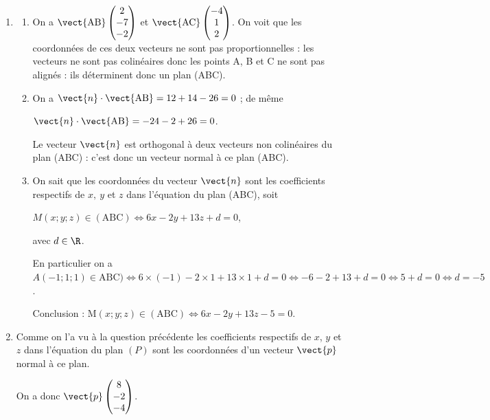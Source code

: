 \begin{enumerate}
	\item \begin{enumerate}
		\item On a $\vect{\text{AB}}\begin{pmatrix}2\\-7\\-2\end{pmatrix}$ et $\vect{\text{AC}}\begin{pmatrix}-4\\1\\2\end{pmatrix}$. On voit que les coordonnées de ces deux vecteurs ne sont pas proportionnelles : les vecteurs ne sont pas colinéaires donc les points A, B et C ne sont pas alignés : ils déterminent donc un plan (ABC).

		\item On a $\vect{n} \cdot \vect{\text{AB}} = 12 + 14 - 26 = 0$ ; de même

		$\vect{n} \cdot \vect{\text{AB}} = - 24 - 2 + 26 = 0$.

		Le vecteur $\vect{n}$ est orthogonal à deux vecteurs non colinéaires du plan (ABC) : c'est donc un vecteur normal à ce plan (ABC).

		\item On sait que les coordonnées du vecteur $\vect{n}$ sont les coefficients respectifs de $x, \: y$ et $z$ dans l'équation du plan (ABC), soit

		$M(x ; y ; z) \in (\text{ABC}) \iff 6x - 2y + 13z + d = 0$,

		avec $d \in \R$.

		En particulier on a $A(-1 ; 1 ; 1) \in \text{ABC}) \iff 6\times (-1) - 2\times 1 + 13\times 1 + d = 0 \iff - 6 - 2 + 13 + d = 0 \iff 5 + d = 0 \iff d = - 5$.

		Conclusion : \quad $\mathrm{M}(x ; y ; z) \in (\text{ABC}) \iff 6x - 2y + 13z - 5 = 0$.
	\end{enumerate}

	\item Comme on l'a vu à la question précédente les coefficients respectifs de $x$, $y$ et $z$ dans l'équation du plan $(P)$ sont les coordonnées d'un vecteur $\vect{p}$ normal à ce plan.

	On a donc $\vect{p}\begin{pmatrix}8\\- 2\\-4\end{pmatrix}$.


\end{enumerate}
